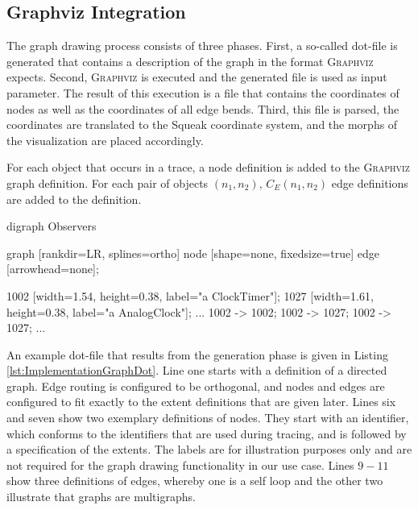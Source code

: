 \subsection{Graphviz Integration}

The graph drawing process consists of three phases.
First, a so-called dot-file is generated that contains a description of the graph in the format \textsc{Graphviz} expects.
Second, \textsc{Graphviz} is executed and the generated file is used as input parameter.
The result of this execution is a file that contains the coordinates of nodes as well as the coordinates of all edge bends.
Third, this file is parsed, the coordinates are translated to the Squeak coordinate system, and the morphs of the visualization are placed accordingly.

For each object that occurs in a trace, a node definition is added to the \textsc{Graphviz} graph definition.
For each pair of objects $(n_1, n_2)$, $C_E(n_1, n_2)$ edge definitions are added to the definition.

\begin{graphviz}[caption={Exemplary definition of a \textsc{Graphviz} graph, consisting of two nodes and three directed edges.}, label=lst:ImplementationGraphDot]
digraph Observers {
	graph [rankdir=LR, splines=ortho]
	node [shape=none, fixedsize=true]
	edge [arrowhead=none];
	
	1002 [width=1.54, height=0.38, label="a ClockTimer"];
	1027 [width=1.61, height=0.38, label="a AnalogClock"];
	...
	1002 -> 1002;
	1002 -> 1027;
	1002 -> 1027;
	...
}
\end{graphviz}

An example dot-file that results from the generation phase is given in Listing \ref{lst:ImplementationGraphDot}.
Line one starts with a definition of a directed graph.
Edge routing is configured to be orthogonal, and nodes and edges are configured to fit exactly to the extent definitions that are given later.
Lines six and seven show two exemplary definitions of nodes.
They start with an identifier, which conforms to the identifiers that are used during tracing, and is followed by a specification of the extents.
The labels are for illustration purposes only and are not required for the graph drawing functionality in our use case.
Lines $9-11$ show three definitions of edges, whereby one is a self loop and the other two illustrate that graphs are multigraphs.

